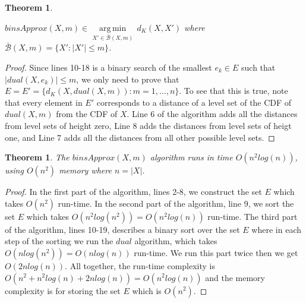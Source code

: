 \documentclass[letterpaper]{article} %
\newtheorem{theorem}[thm]{Theorem}
\begin{document}
\begin{theorem}\label{the:correctnessBinsearch}
	   
    $binsApprox(X,m) \in \underset{X' \in \bar{\mathcal{B}}(X,m) }{\operatorname{arg\,min}}\, d_K(X,X')$ where $\bar{\mathcal{B}}(X,m)=\{X'\colon |X'| \leq m\}$.
\end{theorem}
\begin{proof}
Since lines 10-18 is a binary search of the smallest $e_k\in E$ such that $|dual(X,e_k)|\leq m$, we only need to prove that $E=E'=\{ d_K(X,dual(X,m)) \colon m=1,\dots,n\}$. To see that this is true, note that every element in $E'$ corresponds to a distance of a level set of the CDF of $dual(X,m)$ from the CDF of $X$. Line 6 of the algorithm adds all the distances from level sets of height zero, Line 8 adds the distances from level sets of heigt one, and Line 7 adds all the distances from all other possible level sets.
\end{proof}

\begin{theorem}\label{the:complexityBinsearch}
	The $binsApprox(X,m)$ algorithm runs in time $O(n^2log(n))$, using $O(n^2)$ memory where $n=|X|$.
\end{theorem}
\begin{proof}
	In the first part of the algorithm, lines 2-8, we construct the set $E$ which takes $O(n^2)$ run-time. In the second part of the algorithm, line 9, we sort the set $E$ which takes $O(n^2log(n^2)) = O(n^2log(n))$  run-time. The third part of the algorithm, lines 10-19, describes a binary sort over the set $E$ where in each step of the sorting we run the $dual$ algorithm, which takes $O(n log(n^2)) = O(n log(n))$ run-time. We run this part twice then we get $O(2n log(n))$. All together, the run-time complexity is $O(n^2+n^2log(n)+2n log(n)) = O(n^2log(n))$ and the memory complexity is for storing the set $E$ which is $O(n^2)$.
\end{proof}
\end{document}

